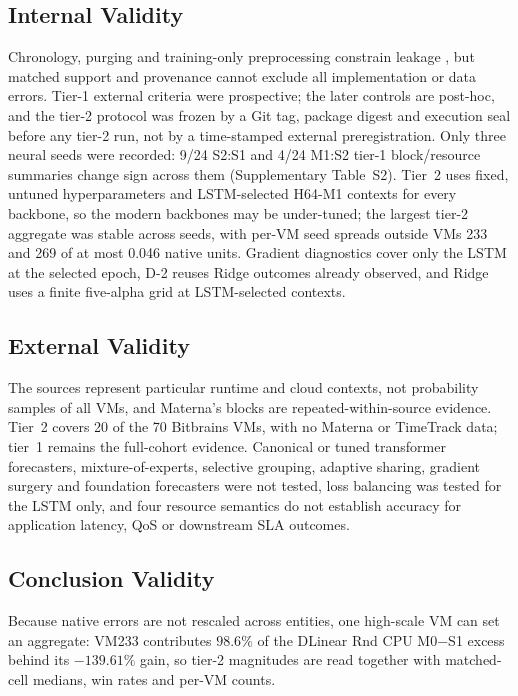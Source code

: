 \documentclass[5p,twocolumn]{elsarticle}
\begin{document}
\subsection{Internal Validity}
\label{sec:threats-internal}

Chronology, purging and training-only preprocessing constrain leakage
\citep{Cerqueira2020Evaluation,Hyndman2021Forecasting}, but matched support and
provenance cannot exclude all implementation or data errors. Tier-1
external criteria were prospective; the later controls are post-hoc, and the
tier-2 protocol was frozen by a Git tag, package digest and execution seal
before any tier-2 run, not by a time-stamped external preregistration. Only
three neural seeds were recorded: 9/24 S2:S1 and 4/24 M1:S2 tier-1
block/resource summaries change sign across them (Supplementary Table~S2).
Tier~2 uses fixed, untuned hyperparameters and LSTM-selected H64-M1 contexts
for every backbone, so the modern backbones may be under-tuned; the largest
tier-2 aggregate was stable across seeds, with per-VM seed spreads outside
VMs 233 and 269 of at most 0.046 native units. Gradient diagnostics cover
only the LSTM at the selected epoch, D-2 reuses Ridge outcomes already
observed, and Ridge uses a finite five-alpha grid at LSTM-selected contexts.

\subsection{External Validity}
\label{sec:threats-external}

The sources represent particular runtime and cloud contexts, not probability
samples of all VMs, and Materna's blocks are repeated-within-source evidence.
Tier~2 covers 20 of the 70 Bitbrains VMs, with no Materna or TimeTrack data;
tier~1 remains the full-cohort evidence. Canonical or tuned transformer
forecasters, mixture-of-experts, selective grouping, adaptive sharing,
gradient surgery and foundation forecasters were not tested, loss balancing
was tested for the LSTM only,
and four resource semantics do not establish accuracy for application
latency, QoS or downstream SLA outcomes.

\subsection{Conclusion Validity}
\label{sec:threats-conclusion}

Because native errors are not rescaled across entities, one high-scale VM
can set an aggregate: VM233 contributes $98.6\%$ of the DLinear Rnd CPU
M0$-$S1 excess behind its $-139.61\%$ gain, so tier-2 magnitudes are read
together with matched-cell medians, win rates and per-VM counts.
\end{document}
